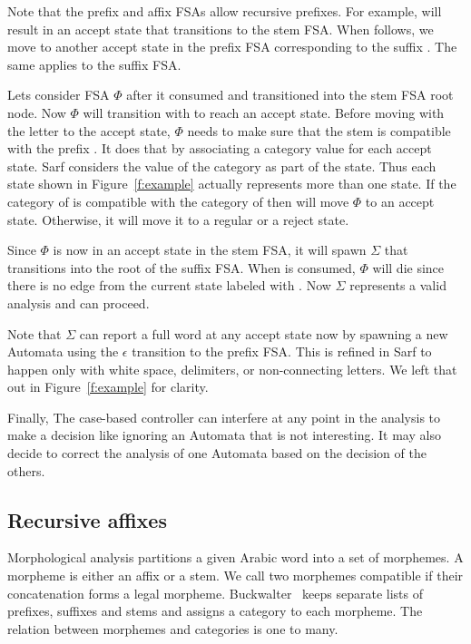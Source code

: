 \documentclass[11pt,letterpaper]{article}
\begin{document}
Note that the prefix and affix FSAs allow recursive 
prefixes. For example,  will result in an accept state
that transitions to the stem FSA. 
When  follows, we move to another accept state in the 
prefix FSA corresponding to the suffix . 
The same applies to the suffix FSA. 

Lets consider FSA $\Phi$ after it consumed  
and transitioned into the stem FSA root node. 
Now $\Phi$ will transition with  to reach an accept 
state. 
Before moving with the letter  to the accept state,
$\Phi$ needs to make sure that the stem  is compatible
with the prefix . 
It does that by associating a category value for each accept state. 
Sarf considers the value of the category as part of the state.
Thus each state shown in Figure~\ref{f:example} actually represents
more than one state. 
If the category of  is compatible with the category of
 then  will move $\Phi$ to an accept state. 
Otherwise, it will move it to a regular or a reject state. 

Since $\Phi$ is now in an accept state in the stem FSA, it will
spawn $\Sigma$ that transitions into the root of the 
suffix FSA. When  is consumed, $\Phi$ will die since 
there is no edge from the current state labeled with . 
Now $\Sigma$ represents a valid analysis and can proceed.

Note that $\Sigma$ can report a full word at any accept state
now by spawning a new Automata using the $\epsilon$ transition
to the prefix FSA.
This is refined in Sarf to happen only with white space, delimiters, 
or non-connecting letters. 
We left that out in Figure~\ref{f:example} for clarity. 

Finally, The case-based controller can interfere at any point in the 
analysis to make a decision like ignoring an Automata that 
is not interesting. 
It may also decide to correct the analysis of one Automata
based on the decision of the others. 

\subsection{Recursive affixes}
\label{sec:recaffix}

Morphological analysis partitions a given Arabic word
into a set of morphemes.
A morpheme is either an affix or a stem. 
We call two morphemes compatible if their concatenation
forms a legal morpheme. 
Buckwalter~ keeps separate lists 
of prefixes, suffixes and stems and assigns a category
to each morpheme. 
The relation between morphemes and categories is one 
to many. 
\end{document}
